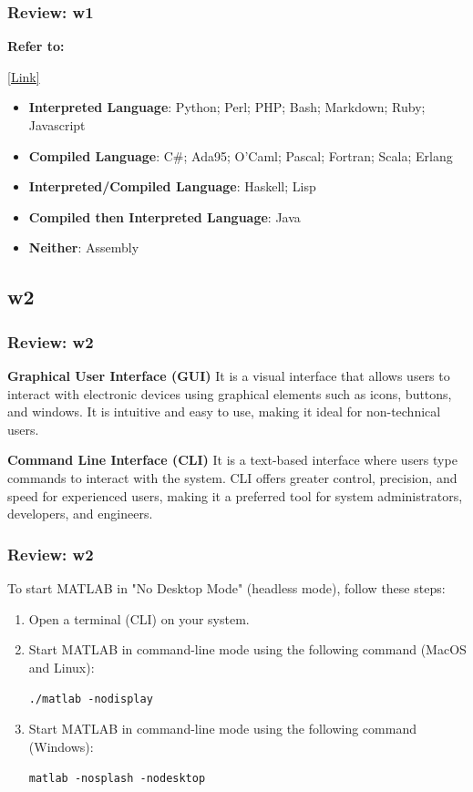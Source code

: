 \documentclass[
	11pt, %
]{beamer}
\begin{document}

\begin{frame}
	\frametitle{Review: w1}

	\textbf{Refer to:}
 
\hyperlink{slide:q7}{[Link]}

\begin{itemize}
    \item \textbf{Interpreted Language}: Python; Perl; PHP; Bash; Markdown; Ruby; Javascript
    \item \textbf{Compiled Language}: C\#; Ada95; O'Caml; Pascal; Fortran; Scala; Erlang
    \item \textbf{Interpreted/Compiled Language}: Haskell; Lisp
    \item \textbf{Compiled then Interpreted Language}: Java
    \item \textbf{Neither}: Assembly
\end{itemize}

\end{frame}


\subsection{w2}

\begin{frame}
	\frametitle{Review: w2}

\textbf{Graphical User Interface (GUI)}
It is a visual interface that allows users to interact with electronic devices using graphical elements such as icons, buttons, and windows. It is intuitive and easy to use, making it ideal for non-technical users.

\textbf{Command Line Interface (CLI)}
It is a text-based interface where users type commands to interact with the system. CLI offers greater control, precision, and speed for experienced users, making it a preferred tool for system administrators, developers, and engineers.

\end{frame}

\begin{frame}
	\frametitle{Review: w2}

	To start MATLAB in "No Desktop Mode" (headless mode), follow these steps:

	\begin{enumerate}
	    \item Open a terminal (CLI) on your system.
	    \item Start MATLAB in command-line mode using the following command (MacOS and Linux):
	    
	    \texttt{./matlab -nodisplay}
	    
	    \item Start MATLAB in command-line mode using the following command (Windows):
	    
	    \texttt{matlab -nosplash -nodesktop}
	\end{enumerate}

\end{frame}
\end{document}
